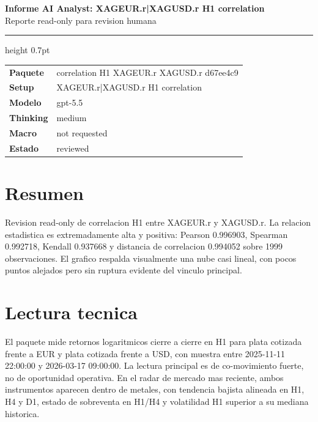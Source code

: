 \documentclass[11pt,a4paper]{article}
\begin{document}
\begin{center}
{\huge\bfseries Informe AI Analyst: XAGEUR.r|XAGUSD.r H1 correlation}\\[0.25em]
{\large Reporte read-only para revision humana}
\end{center}

\vspace{0.2em}
\hrule height 0.7pt
\vspace{0.9em}

\begin{tabularx}{\textwidth}{>{\bfseries}p{3.2cm}X}
Paquete & correlation H1 XAGEUR.r XAGUSD.r d67ee4c9 \\
Setup & XAGEUR.r|XAGUSD.r H1 correlation \\
Modelo & gpt-5.5 \\
Thinking & medium \\
Macro & not requested \\
Estado & reviewed \\
\end{tabularx}

\vspace{0.75em}

\vspace{0.4em}

\section*{Resumen}
Revision read-only de correlacion H1 entre XAGEUR.r y XAGUSD.r. La relacion estadistica es extremadamente alta y positiva: Pearson 0.996903, Spearman 0.992718, Kendall 0.937668 y distancia de correlacion 0.994052 sobre 1999 observaciones. El grafico respalda visualmente una nube casi lineal, con pocos puntos alejados pero sin ruptura evidente del vinculo principal.

\section*{Lectura tecnica}
El paquete mide retornos logaritmicos cierre a cierre en H1 para plata cotizada frente a EUR y plata cotizada frente a USD, con muestra entre 2025-11-11 22:00:00 y 2026-03-17 09:00:00. La lectura principal es de co-movimiento fuerte, no de oportunidad operativa. En el radar de mercado mas reciente, ambos instrumentos aparecen dentro de metales, con tendencia bajista alineada en H1, H4 y D1, estado de sobreventa en H1/H4 y volatilidad H1 superior a su mediana historica.
\end{document}
